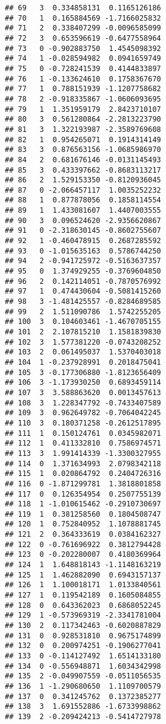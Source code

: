 \documentclass[
]{article}
\begin{document}
\begin{verbatim}
## 69   3  0.334858131  0.1165126186
## 70   1  0.165884569 -1.7166025832
## 71   2  0.338407299 -0.0096585099
## 72   3  0.653596619 -0.6477558964
## 73   0 -0.902883750  1.4545098392
## 74   1 -0.028594982  0.0941659749
## 75   0 -0.728241539  0.4144833897
## 76   1 -0.133624610  0.1758367670
## 77   1  0.788151939 -1.1207758682
## 78   2 -0.918335867 -1.0606093695
## 79   1  1.351959179  2.8423710107
## 80   3  0.561280864 -2.2813223790
## 81   3  1.322193987 -2.3589769608
## 82   1  0.954265071  0.1914314149
## 83   3  0.876563156 -1.0685986970
## 84   2  0.681676146 -0.0131145493
## 85   3  0.433397662 -0.8683113217
## 86   2  1.529153350 -0.8120936045
## 87   0 -2.066457117  1.0035252232
## 88   1  0.877878056  0.1858114554
## 89   1  1.433081607  1.4407003555
## 90   3  0.096524620 -2.9356620867
## 91   0 -2.318630145 -0.8602755607
## 92   1 -0.460478915  0.2687285592
## 93   0 -1.015635163  0.5786744250
## 94   2 -0.941725972 -0.5163637357
## 95   0  1.374929255 -0.3769604850
## 96   2  0.142114051 -0.7870576992
## 97   1  0.474430604 -0.5081415260
## 98   3 -1.481425557 -0.8284689585
## 99   2  1.511090786  1.5742255205
## 100  3  0.104603461 -1.4670705155
## 101  2  2.107815210  1.1581839830
## 102  3  1.577381220 -0.0743208252
## 103  2  0.061495037  1.5370403018
## 104  1 -0.237928991  0.2018475041
## 105  3 -0.177306880 -1.8123656409
## 106  3 -1.173930250  0.6893459114
## 107  3  3.588863620  0.0013457613
## 108  3  1.228347792 -0.7433407589
## 109  3  0.962649782 -0.7064042245
## 110  3  0.180371258 -0.2612517895
## 111  1  0.150124761  0.0345982071
## 112  1  0.411332810  0.7586974571
## 113  3  1.991414339 -1.3300327955
## 114  0  1.371634993  2.0798342118
## 115  1  0.020864792  0.2404726316
## 116  0 -1.871299781  1.3818801858
## 117  0  0.126354954  0.2507755139
## 118  1 -1.010615462 -0.2910730697
## 119  1  0.381258560  0.1804508747
## 120  1  0.752840952  1.1078881745
## 121  2  0.364333619  0.0384162327
## 122  0 -0.761696922  0.3812794428
## 123  0 -0.202280007  0.4180369964
## 124  1  1.648818143 -1.1148163219
## 125  1  1.462882090  0.6943157137
## 126  1  1.100018171  1.0133840561
## 127  1  0.119542189  0.1605084855
## 128  0  0.643362023  0.6868052245
## 129  1 -0.573969319 -2.3341781004
## 130  2  0.117342463 -0.6020887829
## 131  0  0.928531810  0.9675174899
## 132  0  0.200974251 -0.1906277041
## 133  0 -0.114127492  1.6514133180
## 134  0 -0.556948871  1.6034342998
## 135  2 -0.049907559 -0.0511056535
## 136  1 -1.290680650  1.1109700579
## 137  0  0.341245762  0.1372385277
## 138  3  1.691552886 -1.6733998862
## 139  2 -0.209424213 -0.5414727978

\end{verbatim}
\end{document}
